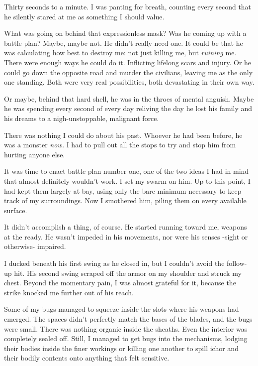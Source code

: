 Thirty seconds to a minute.  I was panting for breath, counting every second that he silently stared at me as something I should value.



What was going on behind that expressionless mask?  Was he coming up with a battle plan?  Maybe, maybe not.  He didn't really need one.  It could be that he was calculating how best to destroy me: not just killing me, but \emph{ruining} me.  There were enough ways he could do it.  Inflicting lifelong scars and injury.  Or he could go down the opposite road and murder the civilians, leaving me as the only one standing.  Both were very real possibilities, both devastating in their own way.



Or maybe, behind that hard shell, he was in the throes of mental anguish.  Maybe he was spending every second of every day reliving the day he lost his family and his dreams to a nigh-unstoppable, malignant force.



There was nothing I could do about his past.  Whoever he had been before, he was a monster \emph{now.}  I had to pull out all the stops to try and stop him from hurting anyone else.



It was time to enact battle plan number one, one of the two ideas I had in mind that almost definitely wouldn't work.  I set my swarm on him.  Up to this point, I had kept them largely at bay, using only the bare minimum necessary to keep track of my surroundings.  Now I smothered him, piling them on every available surface.



It didn't accomplish a thing, of course.  He started running toward me, weapons at the ready.  He wasn't impeded in his movements, nor were his senses -sight or otherwise- impaired.



I ducked beneath his first swing as he closed in, but I couldn't avoid the follow-up hit.  His second swing scraped off the armor on my shoulder and struck my chest.  Beyond the momentary pain, I was almost grateful for it, because the strike knocked me further out of his reach.



Some of my bugs managed to squeeze inside the slots where his weapons had emerged.  The spaces didn't perfectly match the bases of the blades, and the bugs were small.  There was nothing organic inside the sheaths.  Even the interior was completely sealed off.  Still, I managed to get bugs into the mechanisms, lodging their bodies inside the finer workings or killing one another to spill ichor and their bodily contents onto anything that felt sensitive.



